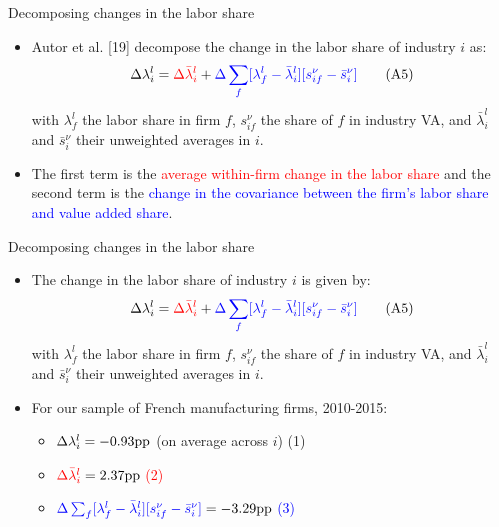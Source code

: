 \documentclass[notes=show]{beamer}
\begin{document}
\begin{frame}{Decomposing changes in the labor share}
\begin{itemize}
\item Autor et al. [19] decompose the change in the labor share of industry $i$ as:
\[
\Delta \lambda_{i}^{l} = \color{red}\Delta \bar{\lambda}_{i}^{l}  \color{black} + \color{blue}\Delta \sum_{f} [ \lambda_{f}^{l} - \bar{\lambda}_{i}^{l} ] [ s_{if}^{\nu} - \bar{s}_{i}^{\nu} ] \color{black} \tag{A5} \label{eqA5}
\]
with $ \lambda_{f}^{l} $ the labor share in firm $f$, $ s_{if}^{\nu} $ the share of $f$ in industry VA, and $ \bar{\lambda}_{i}^{l} $ and $ \bar{s}_{i}^{\nu} $ their unweighted averages in $i$. \medskip
\item The first term is the \textcolor{red}{average within-firm change in the labor share} and the second term is the \textcolor{blue}{change in the covariance between the firm's  labor share and value added share}.
\end{itemize}
\end{frame}

\begin{frame}{Decomposing changes in the labor share}
\begin{itemize}
\item The change in the labor share of industry $i$ is given by:
\[
\Delta \lambda_{i}^{l} = \color{red}\Delta \bar{\lambda}_{i}^{l}  \color{black} + \color{blue}\Delta \sum_{f} [ \lambda_{f}^{l} - \bar{\lambda}_{i}^{l} ] [ s_{if}^{\nu} - \bar{s}_{i}^{\nu} ] \color{black} \tag{A5} \label{eqA5}
\]
with $ \lambda_{f}^{l} $ the labor share in firm $f$, $ s_{if}^{\nu} $ the share of $f$ in industry VA, and $ \bar{\lambda}_{i}^{l} $ and $ \bar{s}_{i}^{\nu} $ their unweighted averages in $i$. \medskip
\item For our sample of French manufacturing firms, 2010-2015: \medskip
\begin{itemize}
\item $ \Delta \lambda_{i}^{l} \color{black} = -0.93 \text{pp}$ (on average across $i$) (1) \medskip
\item $ \color{red}\Delta \bar{\lambda}_{i}^{l} \color{black} = 2.37 \text{pp}$ \textcolor{red}{(2)} \medskip
\item $ \color{blue}\Delta \sum_{f} [ \lambda_{f}^{l} - \bar{\lambda}_{i}^{l} ] [ s_{if}^{\nu} - \bar{s}_{i}^{\nu} ] \color{black} = -3.29 \text{pp}$ \textcolor{blue}{(3)}
\end{itemize}
\end{itemize}
\end{frame}
\end{document}
